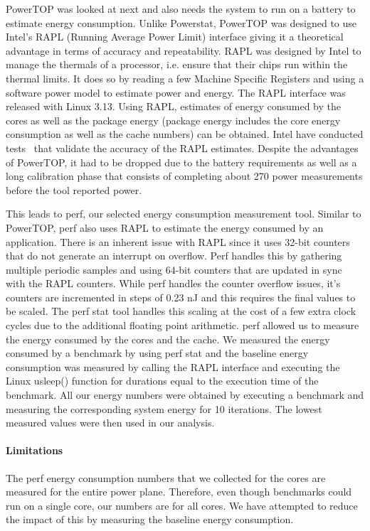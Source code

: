 PowerTOP was looked at next and also needs the system to run on a battery to estimate energy consumption. Unlike Powerstat, PowerTOP was designed to use Intel’s RAPL (Running Average Power Limit) interface giving it a theoretical advantage in terms of accuracy and repeatability. RAPL was designed by Intel to manage the thermals of a processor, i.e. ensure that their chips run within the thermal limits. It does so by reading a few Machine Specific Registers and using a software power model to estimate power and energy. The RAPL interface was released with Linux 3.13. Using RAPL, estimates of energy consumed by the cores as well as the package energy (package energy includes the core energy consumption as well as the cache numbers) can be obtained. Intel have conducted tests~\cite{rotem2012power} that validate the accuracy of the RAPL estimates. Despite the advantages of PowerTOP, it had to be dropped due to the battery requirements as well as a long calibration phase that consists of completing about 270 power measurements before the tool reported power.

This leads to perf, our selected energy consumption measurement tool. Similar to PowerTOP, perf also uses RAPL to estimate the energy consumed by an application.
There is an inherent issue with RAPL since it uses 32-bit counters that do not generate an interrupt on overflow. Perf handles this by gathering multiple periodic samples and using 64-bit counters that are updated in sync with the RAPL counters. While perf handles the counter overflow issues, it’s counters are incremented in steps of 0.23 nJ and this requires the final values to be scaled. The perf stat tool handles this scaling at the cost of a few extra clock cycles due to the additional floating point arithmetic. perf allowed us to measure the energy consumed by the cores and the cache.
We measured the energy consumed by a benchmark by using perf stat and the baseline energy consumption was measured by calling the RAPL interface and executing the Linux usleep() function for durations equal to the execution time of the benchmark. All our energy numbers were obtained by executing a benchmark and measuring the corresponding system energy for 10 iterations. The lowest measured values were then used in our analysis.


\paragraph{Limitations}
 The perf energy consumption numbers that we collected for the cores are measured for the entire power plane. Therefore, even though benchmarks could run on a single core, our numbers are for all cores. We have attempted to reduce the impact of this by measuring the baseline energy consumption.
  

